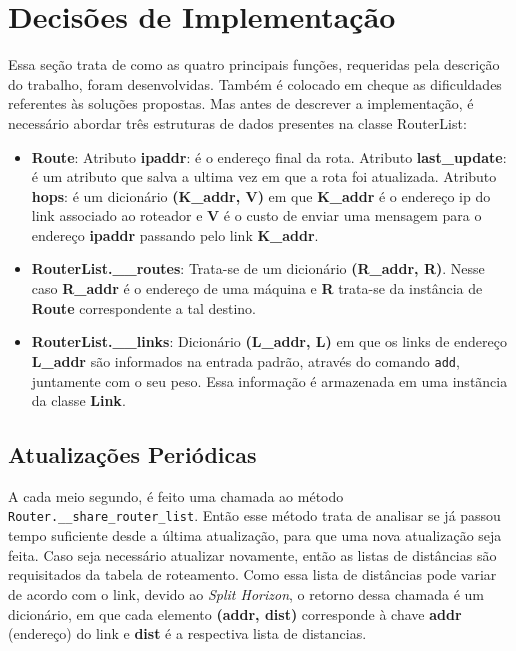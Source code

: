 \section{Decisões de Implementação}

Essa seção trata de como as quatro principais funções, requeridas pela descrição
do trabalho, foram desenvolvidas.
Também é colocado em cheque as dificuldades referentes às soluções propostas.
Mas antes de descrever a implementação, é necessário abordar três estruturas de
dados presentes na classe RouterList:
\begin{itemize}
    \item \textbf{Route}: Atributo \textbf{ipaddr}: é o endereço final da rota.
    Atributo \textbf{last\_update}: é um atributo que salva a ultima vez em que
    a rota foi atualizada.
    Atributo \textbf{hops}: é um dicionário \textbf{(K\_addr, V)} em que
    \textbf{K\_addr} é o endereço ip do link associado ao roteador e \textbf{V}
    é o custo de enviar uma mensagem para o endereço \textbf{ipaddr} passando pelo
    link \textbf{K\_addr}.
    \item \textbf{RouterList.\_\_routes}: Trata-se de um dicionário
    \textbf{(R\_addr, R)}. Nesse caso \textbf{R\_addr} é o endereço de uma
    máquina e \textbf{R} trata-se da instância de \textbf{Route} correspondente
    a tal destino.
    \item \textbf{RouterList.\_\_links}: Dicionário \textbf{(L\_addr, L)} em
    que os links de endereço \textbf{L\_addr} são informados na entrada padrão,
    através do comando \texttt{add}, juntamente com o seu peso.
    Essa informação é armazenada em uma instãncia da classe \textbf{Link}.
\end{itemize}

\subsection{Atualizações Periódicas}
A cada meio segundo, é feito uma chamada ao método \texttt{Router.\_\_share\_router\_list}.
Então esse método trata de analisar se já passou tempo suficiente desde a
última atualização, para que uma nova atualização seja feita.
Caso seja necessário atualizar novamente, então as listas de distâncias 
são requisitados da tabela de roteamento.
Como essa lista de distâncias pode variar de acordo com o link, devido ao
\textit{Split Horizon}, o retorno dessa chamada é um dicionário, em que cada
elemento \textbf{(addr, dist)} corresponde à chave \textbf{addr} (endereço) do
link e \textbf{dist} é a respectiva lista de distancias.

